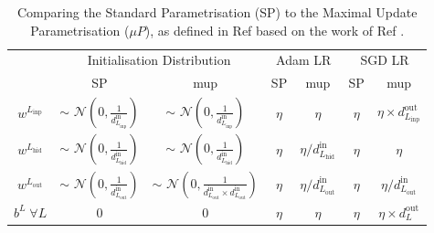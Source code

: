\begin{table}[h]
  \begin{center}
      \begin{tabular}{c|cc|cc|cc} 
      	 \hline \hline
          & \multicolumn{2}{c|}{Initialisation Distribution} & \multicolumn{2}{c|}{Adam LR} & \multicolumn{2}{c}{SGD LR}  \\
            & SP  & \gls{mup} & SP  & \gls{mup} & SP  & \gls{mup}  \\ \hline
          $w^{L_\textrm{inp}}$ & $\sim$ $\mathcal{N}\left(0, \frac{1}{d^{\textrm{in}}_{L_\textrm{inp}}}\right)$ & $\sim$ $\mathcal{N}\left(0, \frac{1}{d^{\textrm{in}}_{L_\textrm{inp}}}\right)$                                         & $\eta$ & $\eta$                                    & $\eta$ & $\eta \times d^{\textrm{out}}_{L_\textrm{inp}}$ \\ 
          $w^{L_\textrm{hid}}$ & $\sim$ $\mathcal{N}\left(0, \frac{1}{d^{\textrm{in}}_{L_\textrm{hid}}}\right)$ & $\sim$ $\mathcal{N}\left(0, \frac{1}{d^{\textrm{in}}_{L_\textrm{hid}}}\right)$                                         & $\eta$ & $\eta / d^{\textrm{in}}_{L_\textrm{hid}}$ & $\eta$ & $\eta$                                    \\ 
          $w^{L_\textrm{out}}$ & $\sim$ $\mathcal{N}\left(0, \frac{1}{d^{\textrm{in}}_{L_\textrm{out}}}\right)$ & $\sim$ $\mathcal{N}\left(0, \frac{1}{d^{\textrm{in}}_{L_\textrm{out}}\times d^{\textrm{in}}_{L_\textrm{out}}}\right)$  & $\eta$ & $\eta / d^{\textrm{in}}_{L_\textrm{out}}$ & $\eta$ & $\eta / d^{\textrm{in}}_{L_\textrm{out}}$ \\
          $b^{L} \;\forall L$ & 0 & 0                                                                                                                                                                                          & $\eta$ & $\eta$                                    & $\eta$ & $\eta \times d^{\textrm{out}}_{L}$              \\  \hline \hline
      \end{tabular}
    \caption{Comparing the Standard Parametrisation (SP) to the Maximal Update Parametrisation ($\mu P$), as defined in Ref \cite{yang2021tuning} based on the work of Ref \cite{pmlr-v139-yang21c}.}
    \label{tab:mupvsspdef}
  \end{center}
\end{table}

